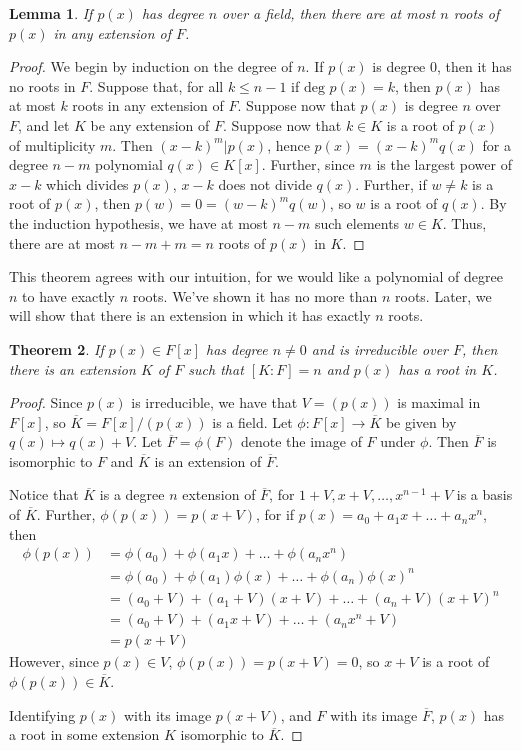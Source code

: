 \documentclass[12pt,leqno]{article}
\numberwithin{equation}{section}
\theoremstyle{plain}
\newtheorem{thm}{Theorem}[section]
\newtheorem{lem}[thm]{Lemma}
\theoremstyle{definition}
\theoremstyle{remark}
\begin{document}
\begin{lem}
 If $p(x)$ has degree $n$ over a field, then there are at most $n$ roots of $p(x)$ in any extension of $F$.
\end{lem}

\begin{proof}
 We begin by induction on the degree of $n$. If $p(x)$ is degree 0, then it has no roots in $F$. Suppose that, for all $k\leq n-1$ if $\text{deg }p(x)=k$, then $p(x)$ has at most $k$ roots in any extension of $F$. Suppose now that $p(x)$ is degree $n$ over $F$, and let $K$ be any extension of $F$. Suppose now that $k\in K$ is a root of $p(x)$ of multiplicity $m$. Then $(x-k)^m|p(x)$, hence $p(x)=(x-k)^mq(x)$ for a degree $n-m$ polynomial $q(x)\in K[x]$. Further, since $m$ is the largest power of $x-k$ which divides $p(x)$, $x-k$ does not divide $q(x)$. Further, if $w\not=k$ is a root of $p(x)$, then $p(w)=0=(w-k)^mq(w)$, so $w$ is a root of $q(x)$. By the induction hypothesis, we have at most $n-m$ such elements $w\in K$. Thus, there are at most $n-m+m=n$ roots of $p(x)$ in $K$. 
\end{proof}

This theorem agrees with our intuition, for we would like a polynomial of degree $n$ to have exactly $n$ roots. We've shown it has no more than $n$ roots. Later, we will show that there is an extension in which it has exactly $n$ roots.

\begin{thm}
 If $p(x)\in F[x]$ has degree $n\not=0$ and is irreducible over $F$, then there is an extension $K$ of $F$ such that $[K:F]=n$ and $p(x)$ has a root in $K$.
\end{thm}

\begin{proof}
 Since $p(x)$ is irreducible, we have that $V=(p(x))$ is maximal in $F[x]$, so $\overline{K}=F[x]/(p(x))$ is a field. Let $\phi:F[x]\to\overline{K}$ be given by $q(x)\mapsto q(x)+V$. Let $\overline{F}=\phi(F)$ denote the image of $F$ under $\phi$. Then $\overline{F}$ is isomorphic to $F$ and $\overline{K}$ is an extension of $\overline{F}$. 

Notice that $\overline{K}$ is a degree $n$ extension of $\overline{F}$, for $1+V,x+V,\hdots,x^{n-1}+V$ is a basis of $\overline{K}$. Further, $\phi(p(x))=p(x+V)$, for if $p(x)=a_0+a_1x+\hdots+a_nx^n$, then \begin{align*}\phi(p(x))&=\phi(a_0)+\phi(a_1x)+\hdots+\phi(a_nx^n)\\&=\phi(a_0)+\phi(a_1)\phi(x)+\hdots+\phi(a_n)\phi(x)^n\\&=(a_0+V)+(a_1+V)(x+V)+\hdots+(a_n+V)(x+V)^n\\&=(a_0+V)+(a_1x+V)+\hdots+(a_nx^n+V)\\&=p(x+V)\end{align*} However, since $p(x)\in V$, $\phi(p(x))=p(x+V)=0$, so $x+V$ is a root of $\phi(p(x))\in\overline{K}$. 

Identifying $p(x)$ with its image $p(x+V)$, and $F$ with its image $\overline{F}$, $p(x)$ has a root in some extension $K$ isomorphic to $\overline{K}$. 
\end{proof}
\end{document}
